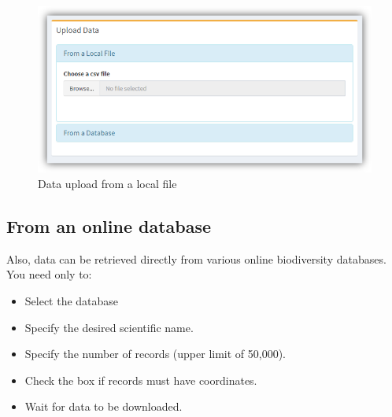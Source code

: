\documentclass[]{book}
\providecommand{\tightlist}{%
  \setlength{\itemsep}{0pt}\setlength{\parskip}{0pt}}
\theoremstyle{definition}
\theoremstyle{definition}
\theoremstyle{definition}
\theoremstyle{remark}
\begin{document}
\begin{figure}
\centering
\includegraphics{img/bdDwC_Up-local_file.png}
\caption{Data upload from a local file}
\end{figure}

\subsection{From an online database}\label{from-an-online-database}

Also, data can be retrieved directly from various online biodiversity
databases. You need only to:

\begin{itemize}
\tightlist
\item
  Select the database
\item
  Specify the desired scientific name.
\item
  Specify the number of records (upper limit of 50,000).
\item
  Check the box if records must have coordinates.
\item
  Wait for data to be downloaded.
\end{itemize}
\end{document}
